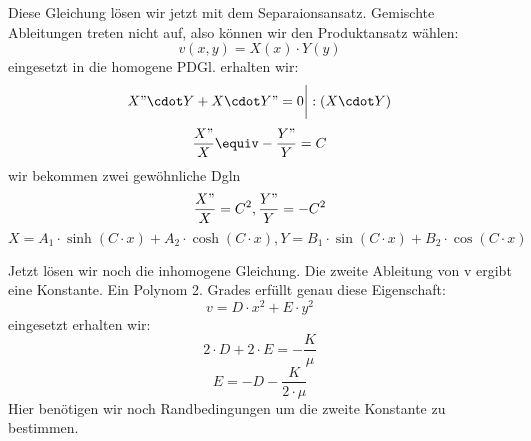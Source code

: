 \documentclass[
	11pt, %
]{beamer}
\begin{document}
\begin{frame}
	\begin{exampleblock}{}
		Diese Gleichung l\"osen wir jetzt mit dem Separaionsansatz. Gemischte Ableitungen treten nicht auf, also k\"onnen wir den Produktansatz w\"ahlen:
		\begin{equation}
			v(x, y)=X(x)\cdot Y(y)
		\end{equation}
		eingesetzt in die homogene PDGl. erhalten wir:
		\begin{equation}
			X"\cdot Y+X\cdot Y"= 0\bigg|:\left(X\cdot Y\right)
		\end{equation}
		\begin{equation}
			\frac{X"}{X}\equiv -\frac{Y"}{Y}=C
		\end{equation}
		wir bekommen zwei gew\"ohnliche Dgln
		\begin{equation}
			\frac{X"}{X}=C^2, \frac{Y"}{Y}=-C^2
		\end{equation}
		\begin{equation}
			X=A_1\cdot \sinh\left(C\cdot x\right)+A_2\cdot \cosh\left(C\cdot x\right), Y=B_1\cdot \sin\left(C\cdot x\right)+B_2\cdot \cos\left(C\cdot x\right)
		\end{equation}
	\end{exampleblock}
\end{frame}
\begin{frame}
	\begin{exampleblock}{}
		Jetzt l\"osen wir noch die inhomogene Gleichung. Die zweite Ableitung von v ergibt eine Konstante. Ein Polynom 2. Grades erf\"ullt genau diese Eigenschaft: 
		\begin{equation}
			v = D\cdot x^2 + E\cdot y^2
		\end{equation}
		eingesetzt erhalten wir:
		\begin{equation}
			2\cdot D+2\cdot E=-\frac{K}{\mu}
		\end{equation}
		\begin{equation}
			E=-D-\frac{K}{2\cdot\mu}
		\end{equation}
		Hier ben\"otigen wir noch Randbedingungen um die zweite Konstante zu bestimmen.
	\end{exampleblock}
\end{frame}
\end{document}
